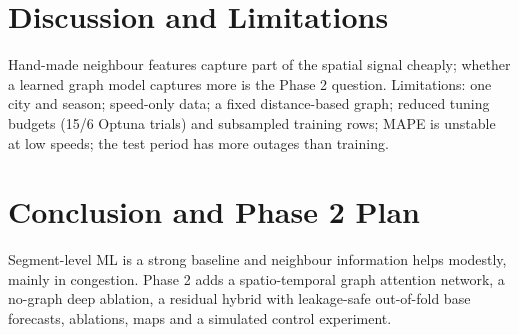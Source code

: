 \documentclass[conference]{IEEEtran}
\begin{document}
\section{Discussion and Limitations}
Hand-made neighbour features capture part of the spatial signal cheaply; whether a learned graph model captures more is the Phase 2 question.
Limitations: one city and season; speed-only data; a fixed distance-based graph; reduced tuning budgets (15/6 Optuna trials) and subsampled training rows; MAPE is unstable at low speeds; the test period has more outages than training.

\section{Conclusion and Phase 2 Plan}
Segment-level ML is a strong baseline and neighbour information helps modestly, mainly in congestion.
Phase 2 adds a spatio-temporal graph attention network, a no-graph deep ablation, a residual hybrid with leakage-safe out-of-fold base forecasts, ablations, maps and a simulated control experiment.



\end{document}
